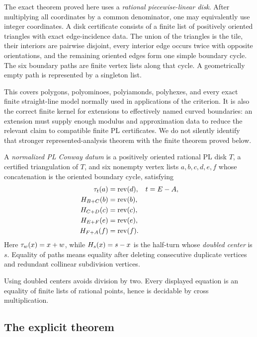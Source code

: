 The exact theorem proved here uses a \emph{rational piecewise-linear disk}.  After multiplying all coordinates by a common denominator, one may equivalently use integer coordinates.  A disk certificate consists of a finite list of positively oriented triangles with exact edge-incidence data.  The union of the triangles is the tile, their interiors are pairwise disjoint, every interior edge occurs twice with opposite orientations, and the remaining oriented edges form one simple boundary cycle.  The six boundary paths are finite vertex lists along that cycle.  A geometrically empty path is represented by a singleton list.

This covers polygons, polyominoes, polyiamonds, polyhexes, and every exact finite straight-line model normally used in applications of the criterion.  It is also the correct finite kernel for extensions to effectively named curved boundaries: an extension must supply enough modulus and approximation data to reduce the relevant claim to compatible finite PL certificates.  We do not silently identify that stronger represented-analysis theorem with the finite theorem proved below.

\begin{definition}
A \emph{normalized PL Conway datum} is a positively oriented rational PL disk \(T\), a certified triangulation of \(T\), and six nonempty vertex lists \(a,b,c,d,e,f\) whose concatenation is the oriented boundary cycle, satisfying
\begin{align}
 \tau_{t}(a)&=\operatorname{rev}(d), & t&=E-A, \label{eq:ad}\\
 H_{B+C}(b)&=\operatorname{rev}(b), \label{eq:bhalf}\\
 H_{C+D}(c)&=\operatorname{rev}(c), \label{eq:chalf}\\
 H_{E+F}(e)&=\operatorname{rev}(e), \label{eq:ehalf}\\
 H_{F+A}(f)&=\operatorname{rev}(f). \label{eq:fhalf}
\end{align}
Here \(\tau_{w}(x)=x+w\), while \(H_{s}(x)=s-x\) is the half-turn whose \emph{doubled center} is \(s\).  Equality of paths means equality after deleting consecutive duplicate vertices and redundant collinear subdivision vertices.
\end{definition}

Using doubled centers avoids division by two.  Every displayed equation is an equality of finite lists of rational points, hence is decidable by cross multiplication.

\subsection{The explicit theorem}

